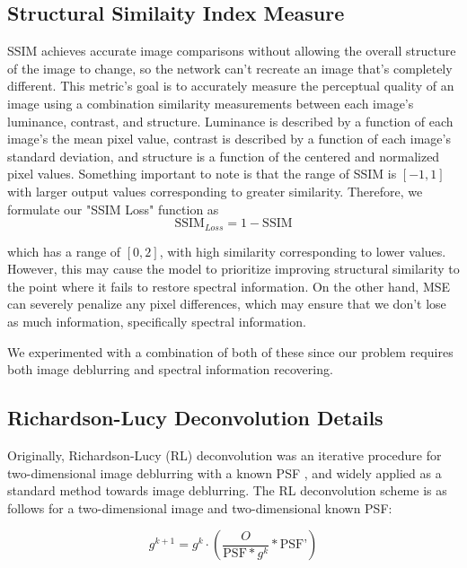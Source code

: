 \documentclass{article}
\begin{document}
\subsection{Structural Similaity Index Measure}
\label{subsec:appendix_ssim}
SSIM achieves accurate image comparisons without allowing the overall structure of the image to change, so the network can't recreate an image that's completely different. This metric's goal is to accurately measure the perceptual quality of an image using a combination similarity
measurements between each image's luminance, contrast, and structure. Luminance is described by a function of each image's the mean pixel value, contrast is described by a function of each image's standard deviation, and structure is a function of the centered and normalized pixel values. Something important to note is that the range of SSIM is $[-1, 1]$ with larger output values corresponding to greater similarity. Therefore, we formulate our "SSIM Loss" function as
\begin{equation}
    \text{SSIM}_{Loss} = 1 - \text{SSIM}
\end{equation}

which has a range of $[0, 2]$, with high similarity corresponding to lower values. However, this may cause the model to prioritize improving structural similarity to the point where it fails to restore spectral information. On the other hand, MSE can severely penalize any pixel differences, which may ensure that we don't lose as much information, specifically spectral information. 

We experimented with a combination of both of these since our problem requires both image deblurring and spectral information recovering.

\subsection{Richardson-Lucy Deconvolution Details}
\label{appendix:RL}
Originally, Richardson-Lucy (RL) deconvolution was an iterative procedure for two-dimensional image deblurring with a known PSF \cite{lucy1974iterative}\cite{richardson1972bayesian}, and widely applied as a standard method towards image deblurring. The RL deconvolution scheme is as follows for a two-dimensional image and two-dimensional known PSF:

\begin{equation}
    g^{k+1} = g^{k} \cdot \left(\frac{O}{\text{PSF} \ast g^{k} } \ast \text{PSF'}\right)
\end{equation}
\end{document}
